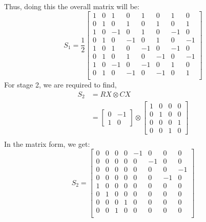 \begin{example}
\begin{enumerate}
\begin{align*}
        \end{align*}
        Thus, doing this the overall matrix will be:
        \[
            S_1 = \frac{1}{2}\begin{bmatrix}
                1 & 0 & 1 & 0 & 1 & 0 & 1 & 0 \\
                0 & 1 & 0 & 1 & 0 & 1 & 0 & 1 \\
                1 & 0 & -1 & 0 & 1 & 0 & -1 & 0 \\
                0 & 1 & 0 & -1 & 0 & 1 & 0 & -1 \\
                1 & 0 & 1 & 0 & -1 & 0 & -1 & 0 \\
                0 & 1 & 0 & 1 & 0 & -1 & 0 & -1 \\
                1 & 0 & -1 & 0 & -1 & 0 & 1 & 0 \\
                0 & 1 & 0 & -1 & 0 & -1 & 0 & 1 \\
            \end{bmatrix}
        \]
        For stage 2, we are required to find,
        \begin{align*}
            S_2 &= RX \otimes CX\\
            &= \begin{bmatrix} 0 & -1 \\ 1 & 0 \end{bmatrix} \otimes \begin{bmatrix} 1 & 0 & 0 & 0 \\
            0 & 1 & 0 & 0 \\
            0 & 0 & 0 & 1 \\
            0 & 0 & 1 & 0 \end{bmatrix} \\
        \end{align*}
        In the matrix form, we get:
        \[
            S_2=\begin{bmatrix}
                0 & 0 & 0 & 0 & -1 & 0 & 0 & 0 \\
                0 & 0 & 0 & 0 & 0 & -1 & 0 & 0 \\
                0 & 0 & 0 & 0 & 0 & 0 & 0 & -1 \\
                0 & 0 & 0 & 0 & 0 & 0 & -1 & 0 \\
                1 & 0 & 0 & 0 & 0 & 0 & 0 & 0 \\
                0 & 1 & 0 & 0 & 0 & 0 & 0 & 0 \\
                0 & 0 & 0 & 1 & 0 & 0 & 0 & 0 \\
                0 & 0 & 1 & 0 & 0 & 0 & 0 & 0 \\

\end{bmatrix}\]
\end{enumerate}
\end{example}
